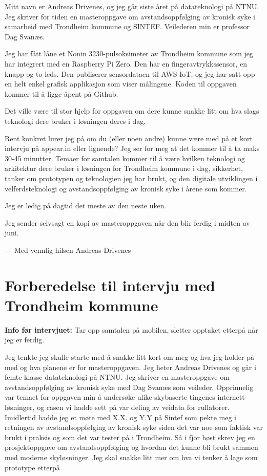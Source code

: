 Mitt navn er Andreas Drivenes, og jeg går siste året på datateknologi på NTNU. Jeg skriver for tiden en masteroppgave
om avstandsoppfølging av kronisk syke i samarbeid med Trondheim kommune og SINTEF. Veilederen min er professor Dag Svanæs.

Jeg har fått låne et Nonin 3230-pulsoksimeter av Trondheim kommune som jeg har integrert med en Raspberry Pi Zero.
Den har en fingeravtrykkssensor, en knapp og to leds. Den publiserer sensordataen til AWS IoT, og jeg har satt opp en helt
enkel grafisk applikasjon som viser målingene. Koden til oppgaven kommer til å ligge åpent på Github.

Det ville være til stor hjelp for oppgaven om dere kunne snakke litt om hva slags teknologi dere bruker i løsningen deres i dag.

Rent konkret lurer jeg på om du (eller noen andre) kunne være med på et kort intervju på appear.in eller lignende? 
Jeg ser for meg at det kommer til å ta maks 30-45 minutter. Temaer for samtalen kommer til å være hvilken teknologi og arkitektur
dere bruker i løsningen for Trondheim kommune i dag, sikkerhet, tanker om prototypen og teknologien jeg har brukt, og den
digitale utviklingen i velferdsteknologi og avstandsoppfølging av kronisk syke i årene som kommer.

Jeg er ledig på dagtid det meste av den neste uken.

Jeg sender selvsagt en kopi av masteroppgaven når den blir ferdig i midten av juni.

\verb|--| \newline
Med vennlig hilsen \newline
Andreas Drivenes \newline

\chapter{Forberedelse til intervju med Trondheim kommune}
\label{appendix:forberedelse}
\textbf{Info før intervjuet:}
Tar opp samtalen på mobilen, sletter opptaket etterpå når jeg er ferdig. 
 
Jeg tenkte jeg skulle starte med å snakke litt kort om meg og hva jeg holder på med og hva planene er for masteroppgaven. Jeg heter Andreas Drivenes og går i femte klasse
datateknologi på NTNU. Jeg skriver en masteroppgave om avstandsoppfølging av kronisk syke med Dag Svanæs som veileder. Opprinnelig var temaet for oppgaven min å undersøke
ulike skybaserte tingenes internett-løsninger, og casen vi hadde sett på var deling av veidata for rullatorer. Imidlertid hadde jeg et møte med X.X. og Y.Y på Sintef som pekte meg i retningen av avstandsoppfølging av kronisk syke siden det var noe som faktisk var brukt i praksis og som det var tester på i Trondheim. Så i fjor høst skrev jeg en prosjektoppgave om avstandsoppfølging og hvordan det kunne bli brukt sammen med moderne skyløsninger. Jeg skal snakke litt mer om hva vi tenker å lage som prototype etterpå
 
